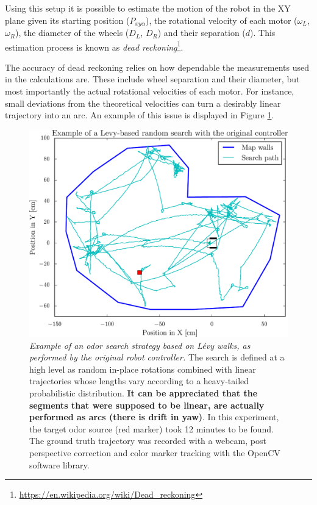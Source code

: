 \documentclass[12pt,twoside]{report}
\begin{document}
Using this setup it is possible to estimate the motion of the robot in the XY plane given its starting position ($P_{xy\alpha}$), the rotational velocity of each motor ($\omega_L$, $\omega_R$), the diameter of the wheels ($D_L$, $D_R$) and their separation ($d$). This estimation process is known as \emph{dead reckoning}\footnote{\url{https://en.wikipedia.org/wiki/Dead_reckoning}}.

The accuracy of dead reckoning relies on how dependable the measurements used in the calculations are. These include wheel separation and their diameter, but most importantly the actual rotational velocities of each motor.
For instance, small deviations from the theoretical velocities can turn a desirably linear trajectory into an arc. An example of this issue is displayed in Figure \ref{fig:levyDriftSingle}.


\begin{figure}[hbtp]
\centerline{
\includegraphics[width=0.85\linewidth]{levy_search_drift}}
\caption[Example of an odor search strategy based on L\'{e}vy walks, as performed by the original robot controller]{\emph{Example of an odor search strategy based on L\'{e}vy walks, as performed by the original robot controller.}
The search is defined at a high level as random in-place rotations combined with linear trajectories whose lengths vary according to a heavy-tailed probabilistic distribution. \textbf{It can be appreciated that the segments that were supposed to be linear, are actually performed as arcs (there is drift in yaw)}.
In this experiment, the target odor source (red marker) took 12 minutes to be found.
The ground truth trajectory was recorded with a webcam, post perspective correction and color marker tracking with the OpenCV software library.}
\label{fig:levyDriftSingle}
\end{figure}
\end{document}
